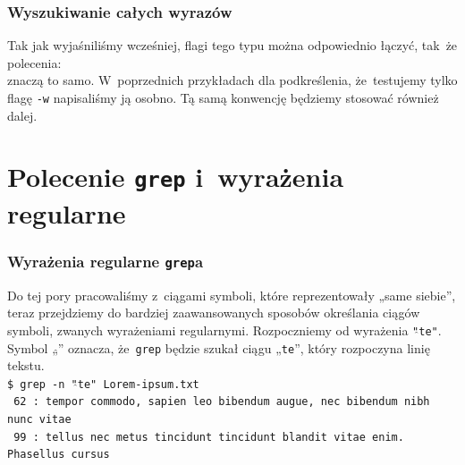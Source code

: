 \documentclass[10pt,t]{beamer}
\begin{document}
\begin{frame}
  \frametitle{Wyszukiwanie całych wyrazów}


  Tak jak wyjaśniliśmy wcześniej, flagi tego typu można odpowiednio łączyć,
  tak~że polecenia: \\

  znaczą to samo. W~poprzednich przykładach dla podkreślenia, że~testujemy
  tylko flagę \texttt{-w} napisaliśmy ją osobno. Tą samą konwencję
  będziemy stosować również dalej.

\end{frame}
































\section{Polecenie \texttt{grep} i~wyrażenia regularne}


\begin{frame}
  \frametitle{Wyrażenia regularne \texttt{grep}a}


  Do tej pory pracowaliśmy z~ciągami symboli, które reprezentowały „same
  siebie”, teraz przejdziemy do bardziej zaawansowanych sposobów określania
  ciągów symboli, zwanych
  {wyrażeniami regularnymi}.
  Rozpoczniemy od wyrażenia
  \texttt{"\hspace{0.2em}$\hat{}$\hspace{0.2em}te"}. Symbol
  „\hspace{0.3em}$\hat{}$\hspace{0.3em}” oznacza, że~\texttt{grep} będzie
  szukał ciągu „\texttt{te}”, który rozpoczyna linię tekstu. \\
  \texttt{\$ grep -n "\hspace{0.2em}$\hat{}$\hspace{0.2em}te"{}
    Lorem-ipsum.txt} \\
  \texttt{{\color{green} 62}{\color{jAxisBlue} :}{\color{red} te}mpor
    commodo, sapien leo bibendum augue, nec bibendum nibh nunc vitae} \\
  \texttt{{\color{green} 99}{\color{jAxisBlue} :}{\color{red} te}llus nec
    metus tincidunt tincidunt blandit vitae enim. Phasellus cursus}

\end{frame}
\end{document}

